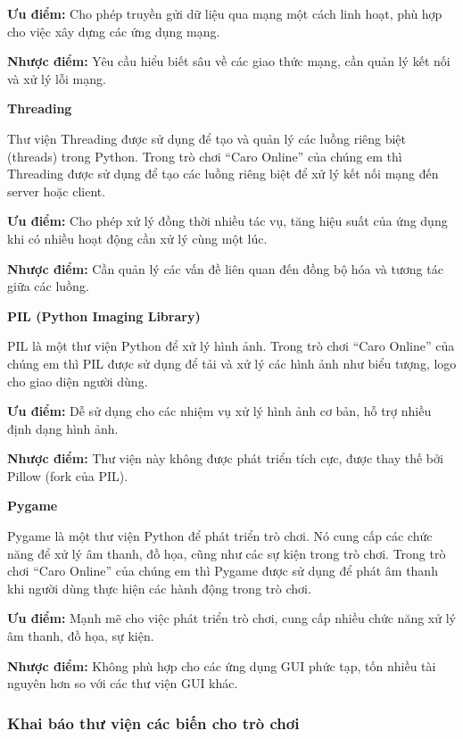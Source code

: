 \documentclass[a4paper]{article}
\begin{document}
\textbf{Ưu điểm:} Cho phép truyền gửi dữ liệu qua mạng một cách linh
hoạt, phù hợp cho việc xây dựng các ứng dụng mạng.

\textbf{Nhược điểm:} Yêu cầu hiểu biết sâu về các giao thức mạng, cần
quản lý kết nối và xử lý lỗi mạng.

\textbf{Threading}

Thư viện Threading được sử dụng để tạo và quản lý các luồng riêng biệt
(threads) trong Python. Trong trò chơi ``Caro Online'' của chúng em thì
Threading được sử dụng để tạo các luồng riêng biệt để xử lý kết nối mạng
đến server hoặc client.

\textbf{Ưu điểm:} Cho phép xử lý đồng thời nhiều tác vụ, tăng hiệu suất
của ứng dụng khi có nhiều hoạt động cần xử lý cùng một lúc.

\textbf{Nhược điểm:} Cần quản lý các vấn đề liên quan đến đồng bộ hóa và
tương tác giữa các luồng.

\textbf{PIL (Python Imaging Library)}

PIL là một thư viện Python để xử lý hình ảnh. Trong trò chơi ``Caro
Online'' của chúng em thì PIL được sử dụng để tải và xử lý các hình ảnh
như biểu tượng, logo cho giao diện người dùng.

\textbf{Ưu điểm:} Dễ sử dụng cho các nhiệm vụ xử lý hình ảnh cơ bản, hỗ
trợ nhiều định dạng hình ảnh.

\textbf{Nhược điểm:} Thư viện này không được phát triển tích cực, được
thay thế bởi Pillow (fork của PIL).

\textbf{Pygame}

Pygame là một thư viện Python để phát triển trò chơi. Nó cung cấp các
chức năng để xử lý âm thanh, đồ họa, cũng như các sự kiện trong trò
chơi. Trong trò chơi ``Caro Online'' của chúng em thì Pygame được sử
dụng để phát âm thanh khi người dùng thực hiện các hành động trong trò
chơi.

\textbf{Ưu điểm:} Mạnh mẽ cho việc phát triển trò chơi, cung cấp nhiều
chức năng xử lý âm thanh, đồ họa, sự kiện.

\textbf{Nhược điểm:} Không phù hợp cho các ứng dụng GUI phức tạp, tốn
nhiều tài nguyên hơn so với các thư viện GUI khác.

\hypertarget{khai-buxe1o-thux1b0-viux1ec7n-cuxe1c-biux1ebfn-cho-truxf2-chux1a1i}{%
\subsubsection{\texorpdfstring{Khai báo thư viện các biến cho trò
chơi
}{Khai báo thư viện các biến cho trò chơi }}\label{khai-buxe1o-thux1b0-viux1ec7n-cuxe1c-biux1ebfn-cho-truxf2-chux1a1i}}
\end{document}
